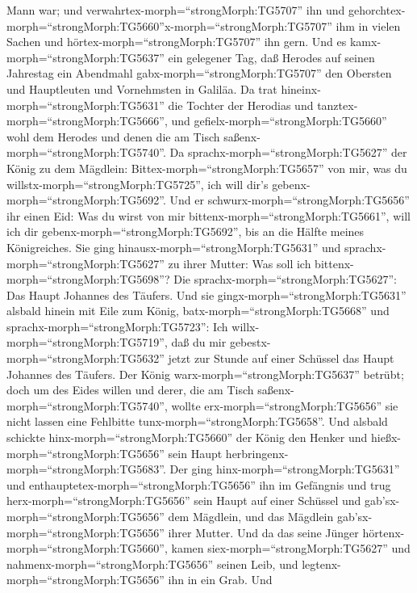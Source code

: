 Mann war; und verwahrtex-morph=``strongMorph:TG5707'' ihn und
gehorchtex-morph=``strongMorph:TG5660''x-morph=``strongMorph:TG5707''
ihm in vielen Sachen und hörtex-morph=``strongMorph:TG5707'' ihn gern.
 Und es kamx-morph=``strongMorph:TG5637'' ein gelegener
Tag, daß Herodes auf seinen Jahrestag ein Abendmahl
gabx-morph=``strongMorph:TG5707'' den Obersten und Hauptleuten und
Vornehmsten in Galiläa.  Da trat
hineinx-morph=``strongMorph:TG5631'' die Tochter der Herodias und
tanztex-morph=``strongMorph:TG5666'', und
gefielx-morph=``strongMorph:TG5660'' wohl dem Herodes und denen die am
Tisch saßenx-morph=``strongMorph:TG5740''. Da
sprachx-morph=``strongMorph:TG5627'' der König zu dem Mägdlein:
Bittex-morph=``strongMorph:TG5657'' von mir, was du
willstx-morph=``strongMorph:TG5725'', ich will dir's
gebenx-morph=``strongMorph:TG5692''.  Und er
schwurx-morph=``strongMorph:TG5656'' ihr einen Eid: Was du wirst von mir
bittenx-morph=``strongMorph:TG5661'', will ich dir
gebenx-morph=``strongMorph:TG5692'', bis an die Hälfte meines
Königreiches.  Sie ging
hinausx-morph=``strongMorph:TG5631'' und
sprachx-morph=``strongMorph:TG5627'' zu ihrer Mutter: Was soll ich
bittenx-morph=``strongMorph:TG5698''? Die
sprachx-morph=``strongMorph:TG5627'': Das Haupt Johannes des Täufers.
 Und sie gingx-morph=``strongMorph:TG5631'' alsbald hinein
mit Eile zum König, batx-morph=``strongMorph:TG5668'' und
sprachx-morph=``strongMorph:TG5723'': Ich
willx-morph=``strongMorph:TG5719'', daß du mir
gebestx-morph=``strongMorph:TG5632'' jetzt zur Stunde auf einer Schüssel
das Haupt Johannes des Täufers.  Der König
warx-morph=``strongMorph:TG5637'' betrübt; doch um des Eides willen und
derer, die am Tisch saßenx-morph=``strongMorph:TG5740'', wollte
erx-morph=``strongMorph:TG5656'' sie nicht lassen eine Fehlbitte
tunx-morph=``strongMorph:TG5658''.  Und alsbald schickte
hinx-morph=``strongMorph:TG5660'' der König den Henker und
hießx-morph=``strongMorph:TG5656'' sein Haupt
herbringenx-morph=``strongMorph:TG5683''. Der ging
hinx-morph=``strongMorph:TG5631'' und
enthauptetex-morph=``strongMorph:TG5656'' ihn im Gefängnis 
und trug herx-morph=``strongMorph:TG5656'' sein Haupt auf einer Schüssel
und gab'sx-morph=``strongMorph:TG5656'' dem Mägdlein, und das Mägdlein
gab'sx-morph=``strongMorph:TG5656'' ihrer Mutter.  Und da
das seine Jünger hörtenx-morph=``strongMorph:TG5660'', kamen
siex-morph=``strongMorph:TG5627'' und
nahmenx-morph=``strongMorph:TG5656'' seinen Leib, und
legtenx-morph=``strongMorph:TG5656'' ihn in ein Grab.  Und
